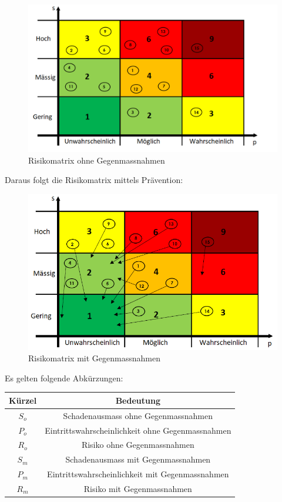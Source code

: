 \documentclass[10pt,a4paper,oneside]{99_fhnwreport}
\begin{document}
\begin{figure}[htbp]
	\centering
	\includegraphics[width=13.5cm]{risiko1.png}
	\caption{Risikomatrix ohne Gegenmassnahmen}
\end{figure}

\newpage

Daraus folgt die Risikomatrix mittels Prävention:

\begin{figure}[htbp]
	\centering
	\includegraphics[width=13.5cm]{risiko2.png}
	\caption{Risikomatrix mit Gegenmassnahmen}
\end{figure}

Es gelten folgende Abkürzungen:

\begin{center}
\begin{tabular}{|c|c|}
	\hline
	\textbf{Kürzel} &  \textbf{Bedeutung} \\ \hline
	$S_{o}$ & Schadenausmass ohne Gegenmassnahmen \\ \hline
	$P_{o}$ & Eintrittswahrscheinlichkeit ohne Gegenmassnahmen \\ \hline
	$R_{o}$ & Risiko ohne Gegenmassnahmen \\ \hline
	$S_{m}$ & Schadenausmass mit Gegenmassnahmen \\ \hline
	$P_{m}$ & Eintrittswahrscheinlichkeit mit  Gegenmassnahmen \\ \hline
	$R_{m}$ & Risiko mit Gegenmassnahmen \\ \hline
\end{tabular}
\end{center}
\end{document}
